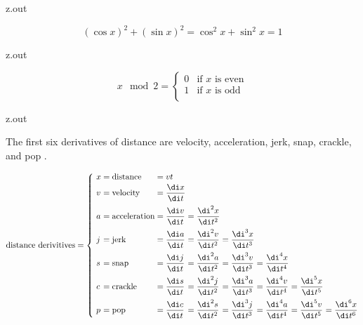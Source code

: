 \MyIO


\begin{VerbatimOut}{z.out}

\begin{equation*}
  (\cos x)^2 + (\sin x)^2 = \cos^2 x + \sin^2 x = 1
\end{equation*}
\end{VerbatimOut}

\MyIO


\begin{VerbatimOut}{z.out}

\begin{equation}
  x \mod 2 =
  \begin{cases}
    0& \text{if \(x\) is even}\\
    1& \text{if \(x\) is odd}\\
  \end{cases}
\end{equation}
\end{VerbatimOut}

\MyIO


\begin{VerbatimOut}{z.out}

The first six derivatives of distance are velocity, acceleration, jerk, snap, crackle,
and pop
\cite{reid2013}.

\begin{equation}
  \AtBeginEnvironment{array}{\everymath{\displaystyle}}
  \arraycolsep = 0pt
  \text{distance derivitives} = \left\{\ %
    \begin{array}{llllllll}
      x&      {}=\text{distance}&     {}=vt\\[2pt]
      v&      {}=\text{velocity}&     {}=\frac{\di x}{\di t}\\[9pt]
      a&      {}=\text{acceleration}& {}=\frac{\di v}{\di t}& {}=\frac{\di^2x}{\di t^2}\\[9pt]
      \mit j& {}=\text{jerk}&         {}=\frac{\di a}{\di t}& {}=\frac{\di^2v}{\di t^2}&
        {}=\frac{\di^3x}{\di t^3}\\[9pt]
      s
        & {}=\text{snap}
        & {}=\frac{\di \mit j}{\di t}
        & {}=\frac{\di^2a}{\di t^2}
        & {}=\frac{\di^3v}{\di t^3}
        & {}=\frac{\di^4x}{\di t^4}\\[9pt]
      c
        & {}=\text{crackle}
        & {}=\frac{\di s}{\di t}
        & {}=\frac{\di^2\mit j}{\di t^2}
        & {}=\frac{\di^3a}{\di t^3}
        & {}=\frac{\di^4v}{\di t^4}
        & {}=\frac{\di^5x}{\di t^5}\\[9pt]
      p
        & {}=\text{pop}
        & {}=\frac{\di c}{\di t}
        & {}=\frac{\di^2s}{\di t^2}
        & {}=\frac{\di^3\mit j}{\di t^3}
        & {}=\frac{\di^4a}{\di t^4}
        & {}=\frac{\di^5v}{\di t^5}
        & {}=\frac{\di^6x}{\di t^6}
    \end{array}
  \right.
\end{equation}
\end{VerbatimOut}

